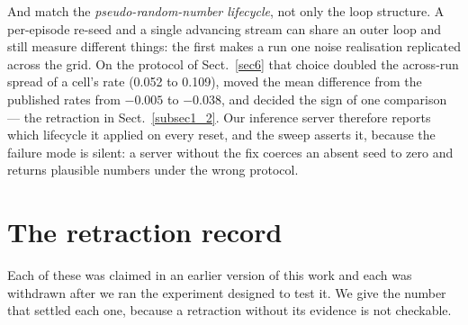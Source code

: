 \documentclass[pdflatex,iicol,sn-apa]{sn-jnl}
\theoremstyle{remark}
\begin{document}
\begin{appendices}
And match the \emph{pseudo-random-number lifecycle}, not only the loop structure. A per-episode
re-seed and a single advancing stream can share an outer loop and still measure different things:
the first makes a run one noise realisation replicated across the grid. On the protocol of
Sect.~\ref{sec6} that choice doubled the across-run spread of a cell's rate (0.052 to 0.109), moved
the mean difference from the published rates from $-0.005$ to $-0.038$, and decided the sign of one
comparison --- the retraction in Sect.~\ref{subsec1_2}. Our inference server therefore reports
which lifecycle it applied on every reset, and the sweep asserts it, because the failure mode is
silent: a server without the fix coerces an absent seed to zero and returns plausible numbers under
the wrong protocol.

\section{The retraction record}\label{secE}

Each of these was claimed in an earlier version of this work and each was withdrawn after we ran the
experiment designed to test it. We give the number that settled each one, because a retraction
without its evidence is not checkable.


\end{appendices}
\end{document}
